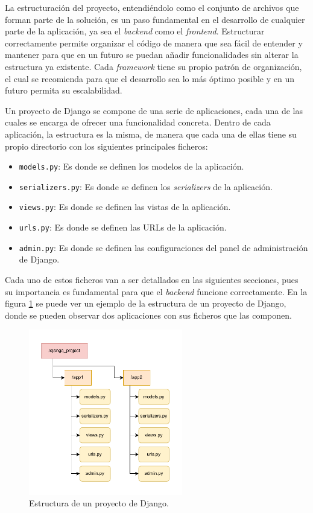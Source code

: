 La estructuración del proyecto, entendiéndolo como el conjunto de archivos que forman parte de la solución, es un paso fundamental en el desarrollo de cualquier parte de la aplicación, ya sea el \textit{backend} como el \textit{frontend}. Estructurar correctamente permite organizar el código de manera que sea fácil de entender y mantener para que en un futuro se puedan añadir funcionalidades sin alterar la estructura ya existente. Cada \textit{framework} tiene su propio patrón de organización, el cual se recomienda para que el desarrollo sea lo más óptimo posible y en un futuro permita su escalabilidad.

Un proyecto de Django se compone de una serie de aplicaciones, cada una de las cuales se encarga de ofrecer una funcionalidad concreta. Dentro de cada aplicación, la estructura es la misma, de manera que cada una de ellas tiene su propio directorio con los siguientes principales ficheros:

\begin{itemize}
    \item \texttt{models.py}: Es donde se definen los modelos de la aplicación.
    \item \texttt{serializers.py}: Es donde se definen los \textit{serializers} de la aplicación.
    \item \texttt{views.py}: Es donde se definen las vistas de la aplicación.
    \item \texttt{urls.py}: Es donde se definen las URLs de la aplicación.
    \item \texttt{admin.py}: Es donde se definen las configuraciones del panel de administración de Django.
\end{itemize}

Cada uno de estos ficheros van a ser detallados en las siguientes secciones, pues su importancia es fundamental para que el \textit{backend} funcione correctamente. En la figura \ref{dev:fig:estructura_django} se puede ver un ejemplo de la estructura de un proyecto de Django, donde se pueden observar dos aplicaciones con sus ficheros que las componen.

\begin{figure}[H]
    \centering
    \includegraphics[width=0.6\textwidth]{figures/design_develop/estructura_django.pdf}
    \caption{Estructura de un proyecto de Django.}
    \label{dev:fig:estructura_django}
\end{figure}

